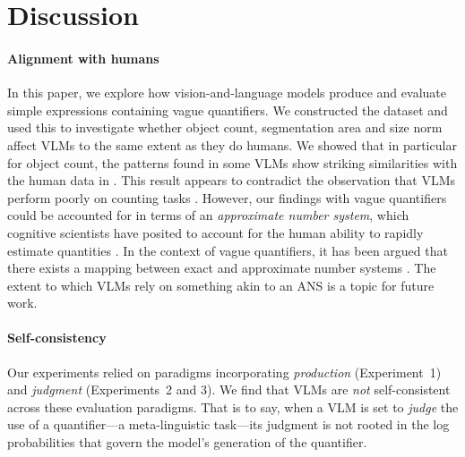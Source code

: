 \section{Discussion}\label{sec:discussion}

\paragraph{Alignment with humans}
In this paper, we explore how vision-and-language models produce and evaluate simple expressions containing vague quantifiers. 
We constructed the \dataset dataset and used this to investigate whether object count, segmentation area and size norm affect VLMs to the same extent as they do humans. 
We showed that in particular for object count, the patterns found in some VLMs show striking similarities with the human data in \dataset. This result appears to contradict the observation that VLMs perform poorly on counting tasks \citep{parcalabescu2021-counting, parcalabescu2022-valse}. However, our findings with vague quantifiers could be accounted for in terms of an \emph{approximate number system}, which cognitive scientists have posited to account for the human ability to rapidly estimate quantities \citep{feigenson2004-number, condry2008-number, dehaene2011-numbersense,odic2018-ans,piantadosi_rational_2016}. 
In the context of vague quantifiers, it has been argued that there exists a mapping between exact and approximate number systems \citep{coventry2005-grounding, coventry2010-space}. The extent to which VLMs rely on something akin to an ANS is a topic for future work.

\paragraph{Self-consistency}
Our experiments relied on paradigms incorporating \emph{production} (Experiment~1) and \emph{judgment} (Experiments~2 and 3). We find that VLMs are \emph{not} self-consistent across these evaluation paradigms. 
That is to say, when a VLM is set to \emph{judge} the use of a quantifier---a meta-linguistic task---its judgment is not rooted in the log probabilities that govern the model's generation of the quantifier.

